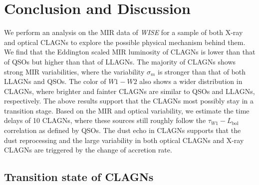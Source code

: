\documentclass[linenumbers]{aastex631}
\begin{document}
\section{Conclusion and Discussion} \label{sec:dis}
 We perform an analysis on the MIR data of {\it WISE} for a sample of both X-ray and optical CLAGNs to explore the possible physical mechanism behind them. We find that the Eddington scaled MIR luminosity of CLAGNs is lower than that of QSOs but higher than that of LLAGNs. The majority of CLAGNs shows strong MIR variabilities, where the variability $\sigma_{m}$ is stronger than that of both LLAGNs and QSOs. The color of $W1-W2$ also shows a wider distribution in CLAGNs, where brighter and fainter CLAGNs are similar to QSOs and LLAGNs, respectively. The above results support that the CLAGNs most possibly stay in a transition stage. Based on the MIR and optical variability, we estimate the time delays of 10 CLAGNs, where these sources still roughly follow the $\tau_{W1}-L_\mathrm{bol}$ correlation as defined by QSOs. The dust echo in CLAGNs supports that the dust reprocessing and the large variability in both optical CLAGNs and X-ray CLAGNs are triggered by the change of accretion rate.
  
\subsection{Transition state of CLAGNs}
\end{document}
